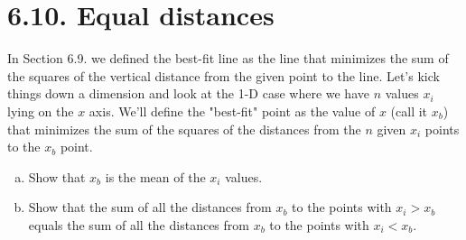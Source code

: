\section*{6.10. Equal distances}
In Section 6.9. we defined the best-fit line as the line that minimizes
the sum of the squares of the vertical distance from the given point
to the line. Let's kick things down a dimension and look at the 1-D
case where we have $n$ values $x_i$ lying on the $x$ axis. We'll define
the "best-fit" point as the value of $x$ (call it $x_b$) that minimizes 
the sum of the squares of the distances from the  $n$ given $x_i$ points
to the $x_b$ point.

\begin{enumerate}[(a)]
    \item Show that $x_b$ is the mean of the $x_i$ values.
    
    \item Show that the sum of all the distances from $x_b$ to the
        points with $x_i > x_b$ equals the sum of all the distances
        from $x_b$ to the points with $x_i < x_b$.
\end{enumerate}

\vspace{1em}

